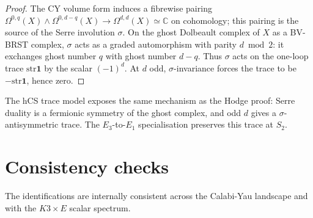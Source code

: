 \documentclass[11pt]{article}
\providecommand{\C}{\mathbb{C}}
\providecommand{\str}{\mathrm{str}}
\begin{document}
\begin{proof}
The CY volume form induces a fibrewise pairing
$\Omega^{0,q}(X)\wedge\Omega^{0,d-q}(X)\to\Omega^{d,d}(X)\simeq\C$ on
cohomology; this pairing is the source of the Serre involution $\sigma$.
On the ghost Dolbeault complex of $X$ as a BV-BRST complex, $\sigma$
acts as a graded automorphism with parity $d\bmod 2$: it exchanges
ghost number $q$ with ghost number $d-q$. Thus $\sigma$ acts on the
one-loop trace $\str\mathbf{1}$ by the scalar $(-1)^{d}$. At $d$ odd,
$\sigma$-invariance forces the trace to be $-\str\mathbf{1}$,
hence zero.
\end{proof}

The hCS trace model exposes the same mechanism as the Hodge proof:
Serre duality is a fermionic symmetry of the ghost complex, and odd
\(d\) gives a \(\sigma\)-antisymmetric trace. The
\(E_3\)-to-\(E_1\) specialisation preserves this trace at \(S_2\).

\section{Consistency checks}
\label{sec:cross-consistency}

The identifications are internally consistent across the Calabi-Yau
landscape and with the $K3\times E$ scalar spectrum.
\end{document}
